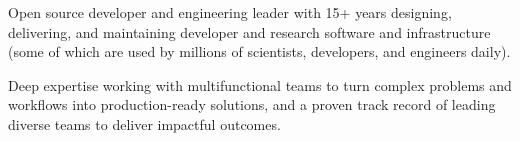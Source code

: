 


\begin{cvparagraph}




Open source developer and engineering leader with 15+ years designing, delivering, and maintaining developer and research software and infrastructure (some of which are used by millions of scientists, developers, and engineers daily).

Deep expertise working with multifunctional teams to turn complex problems and workflows into production-ready solutions, and a proven track record of leading diverse teams to deliver impactful outcomes.

\end{cvparagraph}
